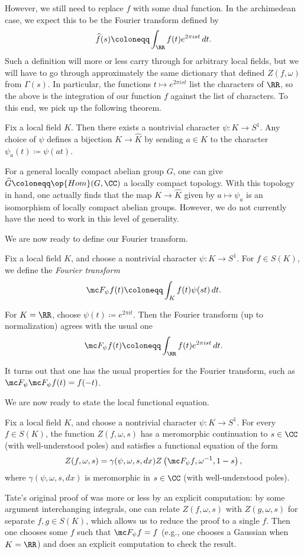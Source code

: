 \documentclass{article}
\begin{document}
However, we still need to replace $f$ with some dual function. In the archimedean case, we expect this to be the Fourier transform defined by
\[\widehat f(s)\coloneqq\int_\RR f(t)e^{2\pi ist}\,dt.\]
Such a definition will more or less carry through for arbitrary local fields, but we will have to go through approximately the same dictionary that defined $Z(f,\omega)$ from $\Gamma(s)$. In particular, the functions $t\mapsto e^{2\pi ist}$ list the characters of $\RR$, so the above is the integration of our function $f$ against the list of characters. To this end, we pick up the following theorem.
\begin{theorem} \label{thm:local-self-dual}
	Fix a local field $K$. Then there exists a nontrivial character $\psi\colon K\to S^1$. Any choice of $\psi$ defines a bijection $K\to\widehat K$ by sending $a\in K$ to the character $\psi_a(t)\coloneqq\psi(at)$.
\end{theorem}
\begin{remark} \label{rem:lca-duality}
	For a general locally compact abelian group $G$, one can give $\widehat G\coloneqq\op{Hom}(G,\CC)$ a locally compact topology. With this topology in hand, one actually finds that the map $K\to\widehat K$ given by $a\mapsto\psi_a$ is an isomorphism of locally compact abelian groups. However, we do not currently have the need to work in this level of generality.
\end{remark}
We are now ready to define our Fourier transform.
\begin{definition} \label{def:local-fourier}
	Fix a local field $K$, and choose a nontrivial character $\psi\colon K\to S^1$. For $f\in S(K)$, we define the \textit{Fourier transform}
	\[\mc F_\psi f(t)\coloneqq\int_Kf(t)\psi(st)\,dt.\]
\end{definition}
\begin{example}
	For $K=\RR$, choose $\psi(t)\coloneqq e^{2\pi it}$. Then the Fourier transform (up to normalization) agrees with the usual one
	\[\mc F_\psi f(t)\coloneqq\int_\RR f(t)e^{2\pi ist}\,dt.\]
\end{example}
It turns out that one has the usual properties for the Fourier transform, such as $\mc F_\psi\mc F_\psi f(t)=f(-t)$.

We are now ready to state the local functional equation.
\begin{theorem} \label{thm:local-fe}
	Fix a local field $K$, and choose a nontrivial character $\psi\colon K\to S^1$. For every $f\in S(K)$, the function $Z(f,\omega,s)$ has a meromorphic continuation to $s\in\CC$ (with well-understood poles) and satisfies a functional equation of the form
	\[Z(f,\omega,s)=\gamma(\psi,\omega,s,dx)Z\left(\mc F_\psi f,\omega^{-1},1-s\right),\]
	where $\gamma(\psi,\omega,s,dx)$ is meromorphic in $s\in\CC$ (with well-understood poles).
\end{theorem}
Tate's original proof of  was more or less by an explicit computation: by some argument interchanging integrals, one can relate $Z(f,\omega,s)$ with $Z(g,\omega,s)$ for separate $f,g\in S(K)$, which allows us to reduce the proof to a single $f$. Then one chooses some $f$ such that $\mc F_\psi f=f$ (e.g., one chooses a Gaussian when $K=\RR$) and does an explicit computation to check the result.
\end{document}
